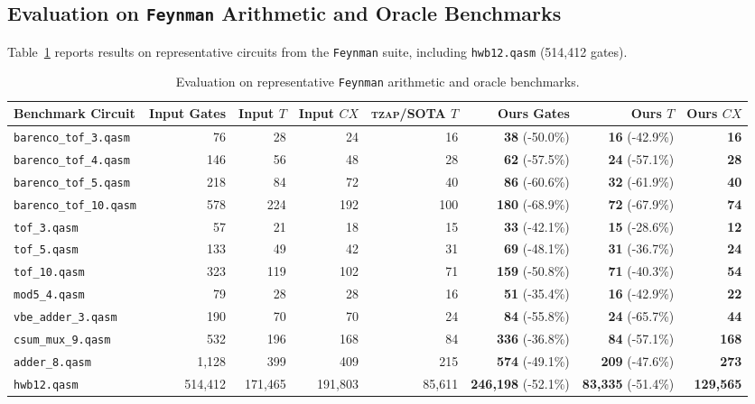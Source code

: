 \documentclass[11pt,a4paper]{article}
\theoremstyle{definition}
\begin{document}
\subsection{Evaluation on \texttt{Feynman} Arithmetic and Oracle Benchmarks}

Table~\ref{tab:feynman} reports results on representative circuits from the \texttt{Feynman} suite, including \texttt{hwb12.qasm} (514,412 gates).

\begin{table}[ht]
\centering
\caption{Evaluation on representative \texttt{Feynman} arithmetic and oracle benchmarks.}
\label{tab:feynman}
\begin{tabular}{lrrrrrrr}
\toprule
Benchmark Circuit & Input Gates & Input $T$ & Input $\mathit{CX}$ & \textsc{tzap}/SOTA $T$ & \textbf{Ours Gates} & \textbf{Ours $T$} & \textbf{Ours $\mathit{CX}$} \\
\midrule
\texttt{barenco\_tof\_3.qasm} & 76 & 28 & 24 & 16 & \textbf{38} (-50.0\%) & \textbf{16} (-42.9\%) & \textbf{16} \\
\texttt{barenco\_tof\_4.qasm} & 146 & 56 & 48 & 28 & \textbf{62} (-57.5\%) & \textbf{24} (-57.1\%) & \textbf{28} \\
\texttt{barenco\_tof\_5.qasm} & 218 & 84 & 72 & 40 & \textbf{86} (-60.6\%) & \textbf{32} (-61.9\%) & \textbf{40} \\
\texttt{barenco\_tof\_10.qasm} & 578 & 224 & 192 & 100 & \textbf{180} (-68.9\%) & \textbf{72} (-67.9\%) & \textbf{74} \\
\texttt{tof\_3.qasm} & 57 & 21 & 18 & 15 & \textbf{33} (-42.1\%) & \textbf{15} (-28.6\%) & \textbf{12} \\
\texttt{tof\_5.qasm} & 133 & 49 & 42 & 31 & \textbf{69} (-48.1\%) & \textbf{31} (-36.7\%) & \textbf{24} \\
\texttt{tof\_10.qasm} & 323 & 119 & 102 & 71 & \textbf{159} (-50.8\%) & \textbf{71} (-40.3\%) & \textbf{54} \\
\texttt{mod5\_4.qasm} & 79 & 28 & 28 & 16 & \textbf{51} (-35.4\%) & \textbf{16} (-42.9\%) & \textbf{22} \\
\texttt{vbe\_adder\_3.qasm} & 190 & 70 & 70 & 24 & \textbf{84} (-55.8\%) & \textbf{24} (-65.7\%) & \textbf{44} \\
\texttt{csum\_mux\_9.qasm} & 532 & 196 & 168 & 84 & \textbf{336} (-36.8\%) & \textbf{84} (-57.1\%) & \textbf{168} \\
\texttt{adder\_8.qasm} & 1,128 & 399 & 409 & 215 & \textbf{574} (-49.1\%) & \textbf{209} (-47.6\%) & \textbf{273} \\
\texttt{hwb12.qasm} & 514,412 & 171,465 & 191,803 & 85,611 & \textbf{246,198} (-52.1\%) & \textbf{83,335} (-51.4\%) & \textbf{129,565} \\
\bottomrule
\end{tabular}
\end{table}
\end{document}
